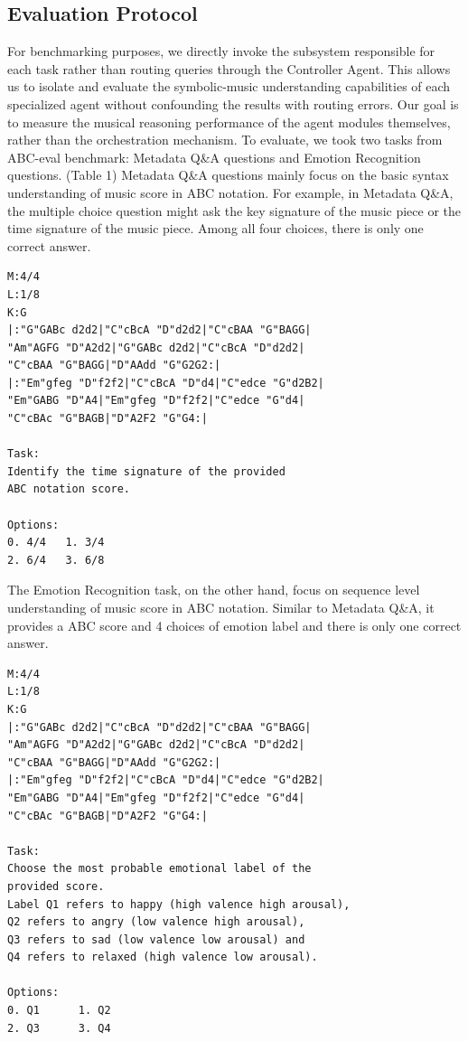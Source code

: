 \documentclass[sigconf]{acmart}
\begin{document}
\subsection {Evaluation Protocol}
For benchmarking purposes, we directly invoke the subsystem responsible for each task rather than routing queries through the Controller Agent. This allows us to isolate and evaluate the symbolic-music understanding capabilities of each specialized agent without confounding the results with routing errors. Our goal is to measure the musical reasoning performance of the agent modules themselves, rather than the orchestration mechanism. To evaluate, we took two tasks from ABC-eval benchmark: Metadata Q\&A questions and Emotion Recognition questions. (Table 1) Metadata Q\&A questions mainly focus on the basic syntax understanding of music score in ABC notation. For example, in Metadata Q\&A, the multiple choice question might ask the key signature of the music piece or the time signature of the music piece. Among all four choices, there is only one correct answer. 
\begin{tcolorbox}[title=Metadata Q\&A, colback=gray!10, colframe=gray!60, listing only]
\begin{verbatim}
M:4/4
L:1/8
K:G
|:"G"GABc d2d2|"C"cBcA "D"d2d2|"C"cBAA "G"BAGG|
"Am"AGFG "D"A2d2|"G"GABc d2d2|"C"cBcA "D"d2d2|
"C"cBAA "G"BAGG|"D"AAdd "G"G2G2:|
|:"Em"gfeg "D"f2f2|"C"cBcA "D"d4|"C"edce "G"d2B2|
"Em"GABG "D"A4|"Em"gfeg "D"f2f2|"C"edce "G"d4|
"C"cBAc "G"BAGB|"D"A2F2 "G"G4:|

Task:
Identify the time signature of the provided 
ABC notation score.

Options:
0. 4/4   1. 3/4
2. 6/4   3. 6/8
\end{verbatim}
\end{tcolorbox}
The Emotion Recognition task, on the other hand, focus on sequence level understanding of music score in ABC notation. Similar to Metadata Q\&A, it provides a ABC score and 4 choices of emotion label and there is only one correct answer.
\begin{tcolorbox}[title=Emotion Recognition, colback=gray!10, colframe=gray!60, listing only]
\begin{verbatim}
M:4/4
L:1/8
K:G
|:"G"GABc d2d2|"C"cBcA "D"d2d2|"C"cBAA "G"BAGG|
"Am"AGFG "D"A2d2|"G"GABc d2d2|"C"cBcA "D"d2d2|
"C"cBAA "G"BAGG|"D"AAdd "G"G2G2:|
|:"Em"gfeg "D"f2f2|"C"cBcA "D"d4|"C"edce "G"d2B2|
"Em"GABG "D"A4|"Em"gfeg "D"f2f2|"C"edce "G"d4|
"C"cBAc "G"BAGB|"D"A2F2 "G"G4:|

Task:
Choose the most probable emotional label of the 
provided score. 
Label Q1 refers to happy (high valence high arousal), 
Q2 refers to angry (low valence high arousal), 
Q3 refers to sad (low valence low arousal) and 
Q4 refers to relaxed (high valence low arousal).

Options:
0. Q1      1. Q2
2. Q3      3. Q4
\end{verbatim}
\end{tcolorbox}
\end{document}
